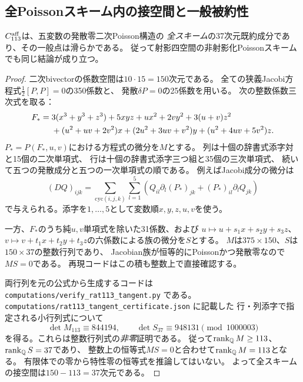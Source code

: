 \subsection{全Poissonスキーム内の接空間と一般被約性}
\begin{theorem}
\label{thm:rat113-smooth-component}
$C_{113}^{\rm aff}$は、五変数の発散零二次Poisson構造の
\emph{全スキーム}の37次元既約成分であり、その一般点は滑らかである。
従って射影四空間の非射影化Poissonスキームでも同じ結論が成り立つ。
\end{theorem}
\begin{proof}
二次bivectorの係数空間は$10\cdot15=150$次元である。
全ての狭義Jacobi方程式$\frac12[P,P]=0$の350係数と、
発散$\delta P=0$の25係数を用いる。
次の整数係数三次式を取る：
\begin{align}\label{eq:rat113-test-F}
 F_*={}&3(x^3+y^3+z^3)+5xyz+ux^2+2vy^2+3(u+v)z^2\notag\\
 &+(u^2+uv+2v^2)x+(2u^2+3uv+v^2)y
 +(u^2+4uv+5v^2)z.
\end{align}
$P_*=P(F_*,u,v)$における方程式の微分を$M$とする。
列は十個の辞書式添字対と15個の二次単項式、
行は十個の辞書式添字三つ組と35個の三次単項式、
続いて五つの発散成分と五つの一次単項式の順である。
例えばJacobi成分の微分は
\begin{equation}\label{eq:rat113-jacobi-differential}
 (DQ)_{ijk}=\sum_{\mathrm{cyc}(i,j,k)}\sum_{l=1}^{5}
 \left(Q_{il}\partial_l(P_*)_{jk}
       +(P_*)_{il}\partial_lQ_{jk}\right)
\end{equation}
で与えられる。添字を$1,\ldots,5$として変数順$x,y,z,u,v$を使う。

一方、$F_*$のうち純$u,v$単項式を除いた31係数、および
$u\mapsto u+s_1x+s_2y+s_3z$、
$v\mapsto v+t_1x+t_2y+t_3z$の六係数による族の微分を$S$とする。
$M$は$375\times150$、$S$は$150\times37$の整数行列であり、
Jacobian族が恒等的にPoissonかつ発散零なので$MS=0$である。
再現コードはこの積も整数上で直接確認する。

両行列を元の公式から生成するコードは
\nolinkurl{computations/verify_rat113_tangent.py} である。
\nolinkurl{computations/rat113_tangent_certificate.json} に記載した
行・列添字で指定される小行列式について
\begin{equation}\label{eq:rat113-minor-certificates}
 \det M_{113}\equiv844194,\qquad
 \det S_{37}\equiv948131\pmod{1000003}
\end{equation}
を得る。これらは整数行列式の\emph{非零}証明である。
従って$\operatorname{rank}_{\mathbb Q}M\ge113$、$\operatorname{rank}_{\mathbb Q}S=37$であり、
整数上の恒等式$MS=0$と合わせて$\operatorname{rank}_{\mathbb Q}M=113$となる。
有限体での零から特性零の恒等式を推論してはいない。
よって全スキームの接空間は$150-113=37$次元である。


\end{proof}
